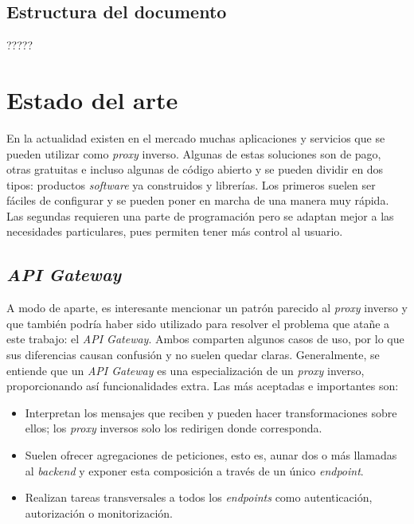 \documentclass[11pt,spanish,listoffigures]{tfgetsinf}
\begin{document}
\section{Estructura del documento}

?????


\chapter{Estado del arte}

En la actualidad existen en el mercado muchas aplicaciones y servicios que se pueden utilizar como \emph{proxy} inverso. Algunas de estas soluciones son de pago, otras gratuitas e incluso algunas de código abierto y se pueden dividir en dos tipos: productos \emph{software} ya construidos y librerías. Los primeros suelen ser fáciles de configurar y se pueden poner en marcha de una manera muy rápida. Las segundas requieren una parte de programación pero se adaptan mejor a las necesidades particulares, pues permiten tener más control al usuario. 

\section{\emph{API Gateway}}

A modo de aparte, es interesante mencionar un patrón parecido al \emph{proxy} inverso y que también podría haber sido utilizado para resolver el problema que atañe a este trabajo: el \emph{API Gateway}. Ambos comparten algunos casos de uso, por lo que sus diferencias causan confusión y no suelen quedar claras. Generalmente, se entiende que un \emph{API Gateway} es una especialización de un \emph{proxy} inverso, proporcionando así funcionalidades extra. Las más aceptadas e importantes son:

\begin{itemize}

\item Interpretan los mensajes que reciben y pueden hacer transformaciones sobre ellos; los \emph{proxy} inversos solo los redirigen donde corresponda.
\item Suelen ofrecer agregaciones de peticiones, esto es, aunar dos o más llamadas al \emph{backend} y exponer esta composición a través de un único \emph{endpoint}.
\item Realizan tareas transversales a todos los \emph{endpoints} como autenticación, autorización o monitorización.

\end{itemize}
\end{document}
